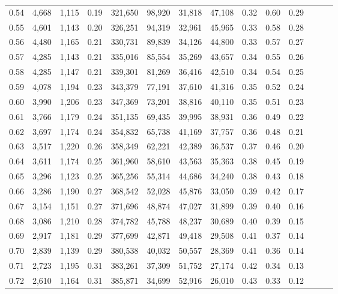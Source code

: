 \begin{tabular}{rrrrrrrrrrrrrr}
0.54 &  4,668 &  1,115 &  0.19 &  321,650 &   98,920 &  31,818 &  47,108 &  0.32 &  0.60 &      0.29 \\
0.55 &  4,601 &  1,143 &  0.20 &  326,251 &   94,319 &  32,961 &  45,965 &  0.33 &  0.58 &      0.28 \\
0.56 &  4,480 &  1,165 &  0.21 &  330,731 &   89,839 &  34,126 &  44,800 &  0.33 &  0.57 &      0.27 \\
0.57 &  4,285 &  1,143 &  0.21 &  335,016 &   85,554 &  35,269 &  43,657 &  0.34 &  0.55 &      0.26 \\
0.58 &  4,285 &  1,147 &  0.21 &  339,301 &   81,269 &  36,416 &  42,510 &  0.34 &  0.54 &      0.25 \\
0.59 &  4,078 &  1,194 &  0.23 &  343,379 &   77,191 &  37,610 &  41,316 &  0.35 &  0.52 &      0.24 \\
0.60 &  3,990 &  1,206 &  0.23 &  347,369 &   73,201 &  38,816 &  40,110 &  0.35 &  0.51 &      0.23 \\
0.61 &  3,766 &  1,179 &  0.24 &  351,135 &   69,435 &  39,995 &  38,931 &  0.36 &  0.49 &      0.22 \\
0.62 &  3,697 &  1,174 &  0.24 &  354,832 &   65,738 &  41,169 &  37,757 &  0.36 &  0.48 &      0.21 \\
0.63 &  3,517 &  1,220 &  0.26 &  358,349 &   62,221 &  42,389 &  36,537 &  0.37 &  0.46 &      0.20 \\
0.64 &  3,611 &  1,174 &  0.25 &  361,960 &   58,610 &  43,563 &  35,363 &  0.38 &  0.45 &      0.19 \\
0.65 &  3,296 &  1,123 &  0.25 &  365,256 &   55,314 &  44,686 &  34,240 &  0.38 &  0.43 &      0.18 \\
0.66 &  3,286 &  1,190 &  0.27 &  368,542 &   52,028 &  45,876 &  33,050 &  0.39 &  0.42 &      0.17 \\
0.67 &  3,154 &  1,151 &  0.27 &  371,696 &   48,874 &  47,027 &  31,899 &  0.39 &  0.40 &      0.16 \\
0.68 &  3,086 &  1,210 &  0.28 &  374,782 &   45,788 &  48,237 &  30,689 &  0.40 &  0.39 &      0.15 \\
0.69 &  2,917 &  1,181 &  0.29 &  377,699 &   42,871 &  49,418 &  29,508 &  0.41 &  0.37 &      0.14 \\
0.70 &  2,839 &  1,139 &  0.29 &  380,538 &   40,032 &  50,557 &  28,369 &  0.41 &  0.36 &      0.14 \\
0.71 &  2,723 &  1,195 &  0.31 &  383,261 &   37,309 &  51,752 &  27,174 &  0.42 &  0.34 &      0.13 \\
0.72 &  2,610 &  1,164 &  0.31 &  385,871 &   34,699 &  52,916 &  26,010 &  0.43 &  0.33 &      0.12 \\

\end{tabular}
